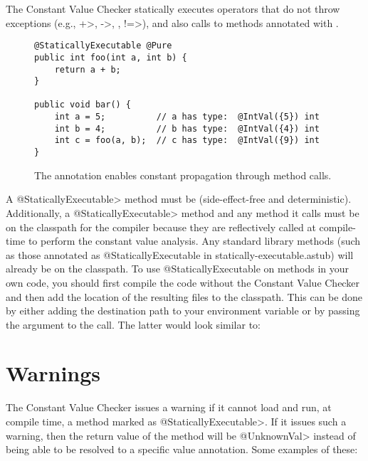 The Constant Value Checker statically executes operators that do
not throw exceptions (e.g., \<+>, \<->, \code{<\relax<}, \<!=>), and also
calls to methods annotated with
.

\begin{figure}
\begin{Verbatim}
@StaticallyExecutable @Pure
public int foo(int a, int b) {
    return a + b;
}

public void bar() {
    int a = 5;          // a has type:  @IntVal({5}) int
    int b = 4;          // b has type:  @IntVal({4}) int
    int c = foo(a, b);  // c has type:  @IntVal({9}) int
}
\end{Verbatim}
\caption{The 
   annotation enables
  constant propagation through method calls.}
\label{fig-staticallyexecutable}
\end{figure}

A \<@StaticallyExecutable> method must
be  (side-effect-free and
deterministic).
Additionally, a \<@StaticallyExecutable> method and any method it calls must be on
the classpath for the compiler because they are reflectively called at
compile-time to perform the constant value analysis. Any standard
library methods (such as those annotated as @StaticallyExecutable in
statically-executable.astub) will already be on the
classpath.
To use @StaticallyExecutable on methods in your own code, you should
first compile the code without the Constant Value Checker and then add
the location of the resulting  files to the
classpath. This can be done by either adding the destination path to
your environment variable  or by passing the
argument  to the call. The latter
would look similar to:



\section{Warnings\label{value-checker-warnings}}

The Constant Value Checker issues a warning if it cannot load and run, at
compile time, a method marked as \<@StaticallyExecutable>.  If it issues
such a warning, then the return value of the method will be \<@UnknownVal>
instead of being able to be resolved to a specific value annotation.
Some examples of these:

